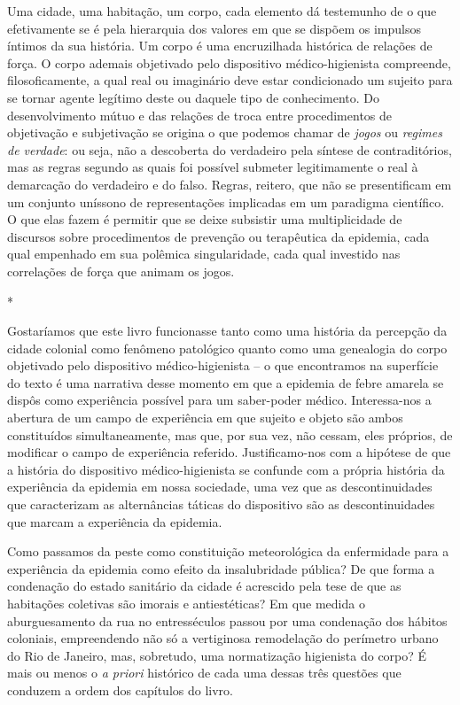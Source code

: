 Uma cidade, uma habitação, um corpo, cada elemento dá testemunho de o
que efetivamente se é pela hierarquia dos valores em que se dispõem os
impulsos íntimos da sua história. Um corpo é uma encruzilhada histórica
de relações de força. O corpo ademais objetivado pelo dispositivo
médico-higienista compreende, filosoficamente, a qual real ou imaginário
deve estar condicionado um sujeito para se tornar agente legítimo deste
ou daquele tipo de conhecimento. Do desenvolvimento mútuo e das relações
de troca entre procedimentos de objetivação e subjetivação se origina o
que podemos chamar de \emph{jogos} ou \emph{regimes de verdade}: ou
seja, não a descoberta do verdadeiro pela síntese de contraditórios, mas
as regras segundo as quais foi possível submeter legitimamente o real à
demarcação do verdadeiro e do falso. Regras, reitero, que não se
presentificam em um conjunto uníssono de representações implicadas em um
paradigma científico. O que elas fazem é permitir que se deixe subsistir
uma multiplicidade de discursos sobre procedimentos de prevenção ou
terapêutica da epidemia, cada qual empenhado em sua polêmica
singularidade, cada qual investido nas correlações de força que animam
os jogos.

*

Gostaríamos que este livro funcionasse tanto como uma história da
percepção da cidade colonial como fenômeno patológico quanto como uma
genealogia do corpo objetivado pelo dispositivo médico-higienista -- o
que encontramos na superfície do texto é uma narrativa desse momento em
que a epidemia de febre amarela se dispôs como experiência possível para
um saber-poder médico. Interessa-nos a abertura de um campo de
experiência em que sujeito e objeto são ambos constituídos
simultaneamente, mas que, por sua vez, não cessam, eles próprios, de
modificar o campo de experiência referido. Justificamo-nos com a
hipótese de que a história do dispositivo médico-higienista se confunde
com a própria história da experiência da epidemia em nossa sociedade,
uma vez que as descontinuidades que caracterizam as alternâncias táticas
do dispositivo são as descontinuidades que marcam a experiência da
epidemia.

Como passamos da peste como constituição meteorológica da enfermidade
para a experiência da epidemia como efeito da insalubridade pública? De
que forma a condenação do estado sanitário da cidade é acrescido pela
tese de que as habitações coletivas são imorais e antiestéticas? Em que
medida o aburguesamento da rua no entresséculos passou por uma
condenação dos hábitos coloniais, empreendendo não só a vertiginosa
remodelação do perímetro urbano do Rio de Janeiro, mas, sobretudo, uma
normatização higienista do corpo? É mais ou menos o \emph{a priori}
histórico de cada uma dessas três questões que conduzem a ordem dos
capítulos do livro.


